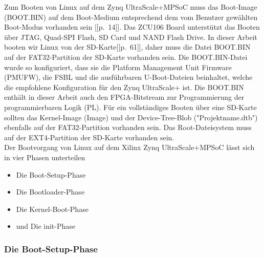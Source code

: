 Zum Booten von Linux auf dem Zynq UltraScale+MPSoC muss das Boot-Image (BOOT.BIN) auf dem Boot-Medium entsprechend dem vom Benutzer gewählten Boot-Modus vorhanden sein [\cite{Xilinx2017}[p.~14]]. Das ZCU106 Board unterstützt das Booten über JTAG, Quad-SPI Flash, SD Card und NAND Flash Drive. In dieser Arbeit booten wir Linux von der SD-Karte[\cite{Xilinx2020}[p.~61]], daher muss die Datei BOOT.BIN auf der FAT32-Partition der SD-Karte vorhanden sein. Die BOOT.BIN-Datei wurde so konfiguriert, dass sie die Platform Management Unit Firmware (PMUFW), die FSBL und die ausführbaren U-Boot-Dateien beinhaltet, welche die empfohlene Konfiguration für den Zynq UltraScale+ ist. Die BOOT.BIN enthält in dieser Arbeit auch den FPGA-Bitstream zur Programmierung der programmierbaren Logik (PL). Für ein vollständiges Booten über eine SD-Karte sollten das Kernel-Image (Image) und der Device-Tree-Blob ("Projektname.dtb") ebenfalls auf der FAT32-Partition vorhanden sein. Das Root-Dateisystem muss auf der EXT4-Partition der SD-Karte vorhanden sein.\\
Der Bootvorgang von Linux auf dem Xilinx Zynq UltraScale+MPSoC lässt sich in vier Phasen unterteilen

\begin{itemize}
	\item Die Boot-Setup-Phase
	\item Die Bootloader-Phase
	\item Die Kernel-Boot-Phase
	\item und Die \grqq init\grqq-Phase
\end{itemize}

\subsubsection{Die Boot-Setup-Phase}

